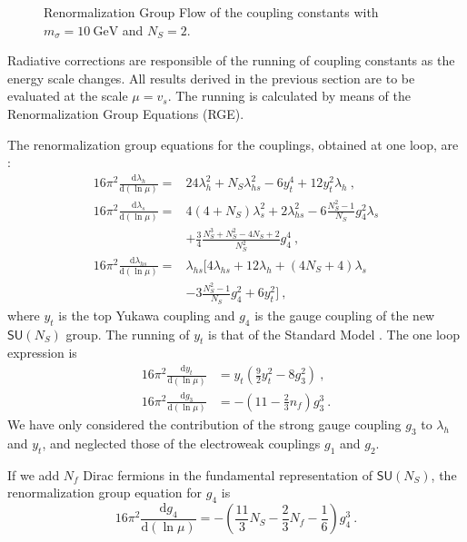 \documentclass[aps,prd,preprintnumbers,nofootinbibn,twocolumn]{revtex4}
\newcommand{\dif}{\mathrm{d}}
\begin{document}
\begin{figure}[t]
\begin{minipage}[b]{0.49\textwidth}
\caption{Renormalization Group Flow of the coupling constants with $m_\sigma = \SI{10}{\giga\electronvolt}$ and $N_S=2$.}\label{fig:sce2}
\end{minipage}
\end{figure}


Radiative corrections are responsible of the running of coupling constants as the energy scale changes. All results derived in the previous section are to be evaluated at the scale $\mu = v_s$. The running is calculated by means of the Renormalization Group Equations (RGE).

The renormalization group equations for the couplings, obtained at one loop, are \cite{Dermisek:2013pta}:
\begin{align}
16\pi^2 \frac{\dif \lambda_h}{\dif (\ln \mu)} =& 24\lambda_h^2 + N_S \lambda_{hs}^2-6 y_t^4 +12y_t^2 \lambda_h \ ,\\
16\pi^2 \frac{\dif \lambda_s}{\dif (\ln \mu)} =& 4(4+N_S)\lambda_s^2 + 2\lambda_{hs}^2 - 6 \frac{N_S^2-1}{N_S}g_4^2 \lambda_s \nonumber \\ &+ \frac{3}{4} \frac{N_S^3 + N_S^2-4N_S+2}{N_S^2}g_4^4 \ , \\
16\pi^2 \frac{\dif \lambda_{hs}}{\dif (\ln \mu)} =& \lambda_{hs} \Big[ 4\lambda_{hs} +12\lambda_h +(4N_S+4)\lambda_s \nonumber \\ &-3 \frac{N_S^2-1}{N_S}g_4^2 +6y_t^2\Big]\ ,
\end{align}
where $y_t$ is the top Yukawa coupling and $g_4$ is the gauge coupling of the new $\mathsf{SU}(N_S)$ group. The running of $y_t$ is that of the Standard Model \cite{Eichhorn:2015kea}. The one loop expression is
\begin{align}
16\pi^2 \frac{\dif y_t}{\dif (\ln \mu)} &= y_t\left(\frac{9}{2}y_t^2 -8g_3^2\right)\ ,\\
16\pi^2 \frac{\dif g_3}{\dif (\ln \mu)} &= -\left(11-\frac{2}{3}n_f\right)g_3^3\ .
\end{align}
We have only considered the contribution of the strong gauge coupling $g_3$ to $\lambda_h$ and $y_t$, and neglected those of the electroweak couplings $g_1$ and $g_2$.

If we add $N_f$ Dirac fermions in the fundamental representation of $\mathsf{SU}(N_S)$, the renormalization group equation for $g_4$ is
\begin{equation}
16\pi^2 \frac{\dif g_4}{\dif (\ln \mu)} = -\left(\frac{11}{3}N_S-\frac{2}{3}N_f -\frac{1}{6}\right)g_4^3\ .
\end{equation}
\end{document}
